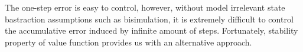 \documentclass[twoside]{article}
\newtheorem{proposition}{Proposition}
\begin{document}
The one-step error is easy to control, however, without model irrelevant state bastraction assumptions such as bisimulation, it is extremely difficult to control the accumulative error induced by infinite amount of steps. Fortunately, stability property of value function provides us with an alternative approach.

\end{document}
